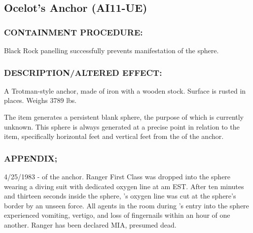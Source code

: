 \subsection*{Ocelot's Anchor (AI11-UE)}
\subsubsection*{CONTAINMENT PROCEDURE:}
\par Black Rock panelling successfully
prevents manifestation of the sphere.
\subsubsection*{DESCRIPTION/ALTERED EFFECT:}
\par A Trotman-style anchor, made of iron
with a wooden stock. Surface is rusted
in places. Weighs 3789 lbs.
\par The item generates a persistent blank sphere, the purpose of
which is currently unknown. This sphere is always generated at a
precise point in relation to the item, specifically  horizontal feet and 
vertical feet from the  of the anchor.
\subsubsection*{APPENDIX;}
\par 4/25/1983 -  of the anchor.
Ranger First Class was dropped into the sphere wearing a diving suit with dedicated
oxygen line at  am EST. After ten minutes and
thirteen seconds inside the sphere, 's oxygen line
was cut at the sphere's border by an unseen force. All agents in
the room during 's entry into the sphere experienced
vomiting, vertigo, and loss of fingernails within an hour of one
another. Ranger  has been declared MIA, presumed
dead.
